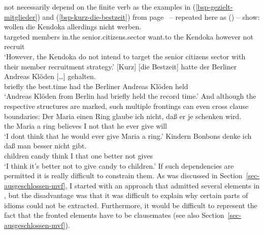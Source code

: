 not necessarily depend on the finite verb as the examples in (\ref{bsp-gezielt-mitglieder}) and
(\ref{bsp-kurz-die-bestzeit}) from page~\pageref{bsp-gezielt-mitglieder} -- repeated
here as () -- show:
\eal
\ex
\gll [Gezielt] [Mitglieder] [im     Seniorenbereich]       wollen  die Kendoka allerdings nicht werben.\footnotemark\\
    \spacebr{}targeted \spacebr{}members     \spacebr{}in.the senior.citizens.sector want.to the Kendoka however    not   recruit\\
\glt `However, the Kendoka do not intend to target the senior citizens sector with their member recruitment strategy.'%
\label{bsp-gezielt-mitglieder-zwei}
\ex 
\gll {}[Kurz] [die Bestzeit] hatte der Berliner Andreas Klöden [\ldots] gehalten.\footnotemark\\
	 \spacebr{}briefly \spacebr{}the best.time had the Berliner Andreas Klöden {} held\\
\label{bsp-kurz-die-bestzeit-zwei}     
\glt `Andreas Klöden from Berlin had briefly held the record time.'
\zl
And although the respective structures are marked, such multiple frontings can even cross clause boundaries:
\eal
\label{ex-der-maria-einen-ring}
\ex 
\gll Der Maria einen Ring glaube ich nicht, daß er je schenken wird.\footnotemark\\
	 the Maria a ring believes I not that he ever give will\\
\glt `I dont think that he would ever give Maria a ring.'
\ex 
\gll Kindern Bonbons denke ich daß  man besser nicht gibt.\footnotemark\\
     children candy  think I   that one better not   gives\\
\glt `I think it's better not to give candy to children.'
\zl
If such dependencies are permitted it is really difficult to constrain them. As was discussed in
Section~\ref{sec-ausgeschlossen-mvf}, I started with an approach that admitted several elements in \slasch, but the
disadvantage was that it was difficult to explain why certain parts of idioms could not be
extracted. Furthermore, it would be difficult to represent the fact that the fronted elements have
to be clausemates (see also Section~\ref{sec-ausgeschlossen-mvf}).

